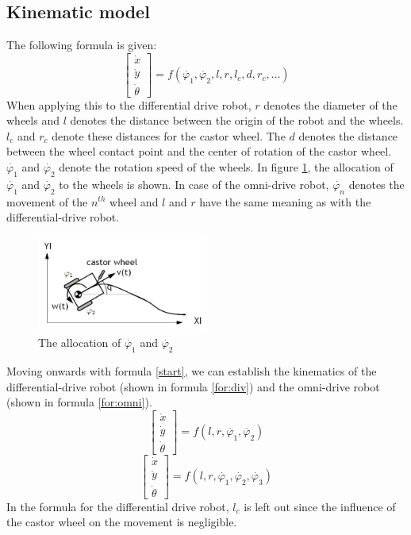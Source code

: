 \documentclass[12pt]{article}
\begin{document}
\subsection{Kinematic model}
The following formula is given: 
\begin{equation}
    \begin{bmatrix} 
        \dot{x} \\ 
        \dot{y} \\ 
        \dot{\theta}
    \end{bmatrix} 
    = f(\dot{\varphi_1}, \dot{\varphi_2}, l, r, l_c, d, r_c, \ldots)
    \label{start}
\end{equation}
When applying this to the differential drive robot, $r$ denotes the diameter of the wheels and $l$ denotes the distance between the origin of the robot and the wheels. $l_c$ and $r_c$ denote these distances for the castor wheel. The $d$ denotes the distance between the wheel contact point and the center of rotation of the castor wheel. $\dot{\varphi_1}$ and $\dot{\varphi_2}$ denote the rotation speed of the wheels. In figure \ref{wheels}, the allocation of $\dot{\varphi_1}$ and $\dot{\varphi_2}$ to the wheels is shown. In case of the omni-drive robot, $\dot{\varphi_n}$ denotes the movement of the $n^{th}$ wheel and $l$ and $r$ have the same meaning as with the differential-drive robot.
\begin{figure}[h!]
    \centering
    \includegraphics[width=0.5\textwidth]{wheels.png}
    \caption{The allocation of $\dot{\varphi_1}$ and $\dot{\varphi_2}$}
    \label{wheels}
\end{figure}
\clearpage
Moving onwards with formula \ref{start}, we can establish the kinematics of the differential-drive robot (shown in formula \ref{for:div}) and the omni-drive robot (shown in formula \ref{for:omni}).
\begin{equation}
    \begin{bmatrix} 
        \dot{x} \\ 
        \dot{y} \\ 
        \dot{\theta}
    \end{bmatrix} 
    = f(l, r, \dot{\varphi_1}, \dot{\varphi_2})
    \label{for:div}
\end{equation} 
\begin{equation}
    \begin{bmatrix} 
        \dot{x} \\ 
        \dot{y} \\ 
        \dot{\theta}
    \end{bmatrix} 
    = f(l, r, \dot{\varphi_1}, \dot{\varphi_2}, \dot{\varphi_3})
    \label{for:omni}
\end{equation} 
In the formula for the differential drive robot, $l_c$ is left out since the influence of the castor wheel on the movement is negligible.
\end{document}
